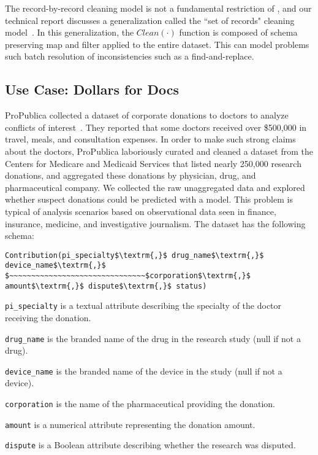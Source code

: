 The record-by-record cleaning model is not a fundamental restriction of \sys, and our technical report discusses a generalization called the ``set of records" cleaning model~\cite{activecleanarxiv}.
In this generalization, the $Clean(\cdot)$ function is composed of schema preserving \textsf{map} and \textsf{filter} applied to the entire dataset.
This can model problems such batch resolution of inconsistencies such as a find-and-replace.

\subsection{Use Case: Dollars for Docs}\label{s:usecase}
ProPublica collected a dataset of corporate donations to doctors to analyze conflicts of interest~\cite{dollarsfordocsa}. 
They reported that some doctors received over \$500,000 in travel, meals, and consultation expenses.
In order to make such strong claims about the doctors, ProPublica laboriously curated and cleaned a dataset from the Centers for Medicare and Medicaid Services that listed nearly 250,000 research donations, and aggregated these donations by physician, drug, and pharmaceutical company.
We collected the raw unaggregated data and explored whether suspect donations could be predicted with a model.
This problem is typical of analysis scenarios based on observational data seen in finance, insurance, medicine, and investigative journalism.
The dataset has the following schema:
\begin{lstlisting}[mathescape,basicstyle={\small}]
Contribution(pi_specialty$\textrm{,}$ drug_name$\textrm{,}$ device_name$\textrm{,}$
$~~~~~~~~~~~~~~~~~~~~~~~~~~~~~~~$corporation$\textrm{,}$ amount$\textrm{,}$ dispute$\textrm{,}$ status)
\end{lstlisting}

\noindent\texttt{pi\_specialty} is a textual attribute describing the specialty of the doctor receiving the donation.

\noindent\texttt{drug\_name} is the branded name of the drug in the research study (null if not a drug).

\noindent\texttt{device\_name} is the branded name of the device in the study (null if not a device).

\noindent\texttt{corporation} is the name of the pharmaceutical providing the donation.

\noindent\texttt{amount} is a numerical attribute representing the donation amount.

\noindent\texttt{dispute} is a Boolean attribute describing whether the research was disputed.

